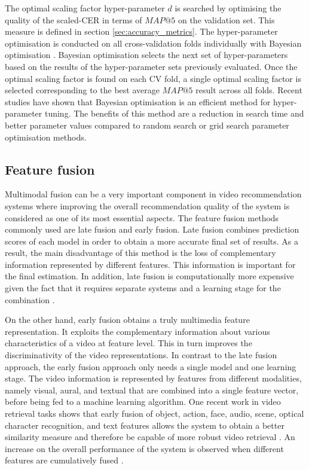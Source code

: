 \documentclass[review]{elsarticle}
\begin{document}
The optimal scaling factor hyper-parameter $d$ is searched by optimising the quality of the scaled-CER in terms of $MAP@5$ on the validation set. This measure is defined in section \ref{sec:accuracy_metrics}. The hyper-parameter optimisation is conducted on all cross-validation folds individually with Bayesian optimisation \citep{deldjoo2019movie}. Bayesian optimisation selects the next set of hyper-parameters based on the results of the hyper-parameter sets previously evaluated. Once the optimal scaling factor is found on each CV fold, a single optimal scaling factor is selected corresponding to the best average $MAP@5$ result across all folds. Recent studies \citep{deldjoo2019movie,dacrema2019we} have shown that Bayesian optimisation is an efficient method for hyper-parameter tuning. The benefits of this method are a reduction in search time and better parameter values compared to random search or grid search parameter optimisation methods. 








\subsection{Feature fusion}\label{sec:fusionAlgorithm}
Multimodal fusion can be a very important component in video recommendation systems where improving the overall recommendation quality of the system is considered as one of its most essential aspects. The feature fusion methods commonly used are late fusion and early fusion. Late fusion combines prediction scores of each model in order to obtain a more accurate final set of results. As a result, the main disadvantage of this method is the loss of complementary information represented by different features. This information is important for the final estimation. In addition, late fusion is computationally more expensive given the fact that it requires separate systems and a learning stage for the combination \citep{deldjoo2019movie}. 

On the other hand, early fusion obtains a truly multimedia feature representation. It exploits the complementary information about various characteristics of a video at feature level. This in turn improves the discriminativity of the video representations. In contrast to the late fusion approach, the early fusion approach only needs a single model and one learning stage. The video information is represented by features from different modalities, namely visual, aural, and textual that are combined into a single feature vector, before being fed to a machine learning algorithm. One recent work in video retrieval tasks shows that early fusion of object, action, face, audio, scene, optical character recognition, and text features allows the system to obtain a better similarity measure and therefore be capable of more robust video retrieval \citep{liu2019use}. An increase on the overall performance of the system is observed when different features are cumulatively fused \citep{liu2019use}. 
\end{document}

